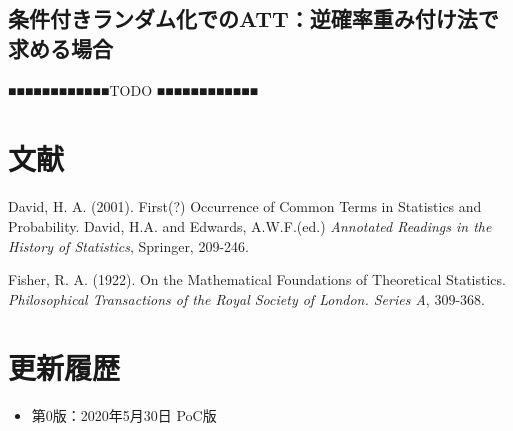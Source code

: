 \documentclass[12pt]{jsarticle}
\begin{document}
\subsection{条件付きランダム化でのATT：逆確率重み付け法で求める場合}
■■■■■■■■■■■■TODO ■■■■■■■■■■■■


\section{文献}
David, H. A. (2001). First(?) Occurrence of Common Terms in Statistics and Probability. David, H.A. and Edwards, A.W.F.(ed.) {\it Annotated Readings in the History of Statistics}, Springer, 209-246.

Fisher, R. A. (1922). On the Mathematical Foundations of Theoretical Statistics. {\it Philosophical Transactions of the Royal Society of London. Series A}, 309-368.

\section{更新履歴}
\begin{itemize}
\item 第0版：2020年5月30日 PoC版
\end{itemize}
\end{document}
